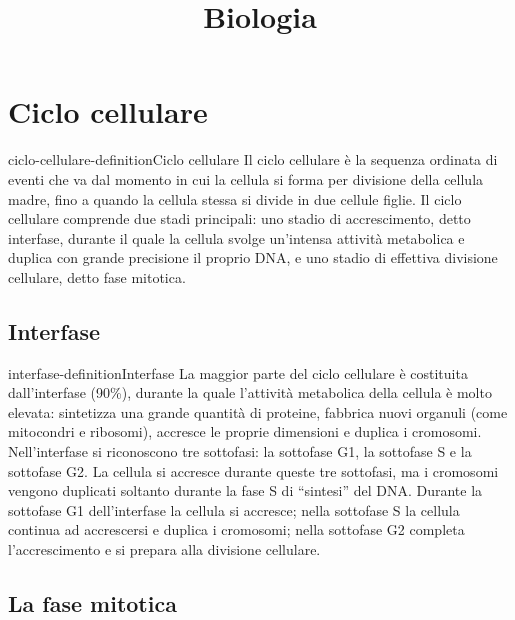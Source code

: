 \documentclass[preview]{standalone}
\begin{document}
\title{Biologia}
\genpage

\section{Ciclo cellulare}

\begin{snippetdefinition}{ciclo-cellulare-definition}{Ciclo cellulare}
    Il ciclo cellulare è la sequenza ordinata di eventi che va dal momento in cui la cellula si forma
    per divisione della cellula madre, fino a quando la cellula stessa si divide in due cellule figlie.
    Il ciclo cellulare comprende due stadi principali: uno stadio di accrescimento, detto interfase,
    durante il quale la cellula svolge un'intensa attività metabolica e duplica con grande
    precisione il proprio DNA, e uno stadio di effettiva divisione cellulare, detto fase mitotica.
\end{snippetdefinition}



\subsection{Interfase}

\begin{snippetdefinition}{interfase-definition}{Interfase}
    La maggior parte del ciclo cellulare è costituita dall'interfase (90\%), durante la quale l'attività
    metabolica della cellula è molto elevata: sintetizza una grande quantità di proteine, fabbrica
    nuovi organuli (come mitocondri e ribosomi), accresce le proprie dimensioni e duplica i
    cromosomi. Nell'interfase si riconoscono tre sottofasi: la sottofase G1, la sottofase S e la
    sottofase G2. La cellula si accresce durante queste tre sottofasi, ma i cromosomi vengono
    duplicati soltanto durante la fase S di “sintesi” del DNA. Durante la sottofase G1
    dell'interfase la cellula si accresce; nella sottofase S la cellula continua ad accrescersi e
    duplica i cromosomi; nella sottofase G2 completa l'accrescimento e si prepara alla divisione
    cellulare.
\end{snippetdefinition}

\subsection{La fase mitotica}
\end{document}
